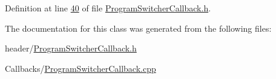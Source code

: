 Definition at line \hyperlink{_program_switcher_callback_8h_source_l00040}{40} of file \hyperlink{_program_switcher_callback_8h_source}{Program\+Switcher\+Callback.\+h}.



The documentation for this class was generated from the following files\+:\begin{DoxyCompactItemize}
\item 
header/\hyperlink{_program_switcher_callback_8h}{Program\+Switcher\+Callback.\+h}\item 
Callbacks/\hyperlink{_program_switcher_callback_8cpp}{Program\+Switcher\+Callback.\+cpp}\end{DoxyCompactItemize}
